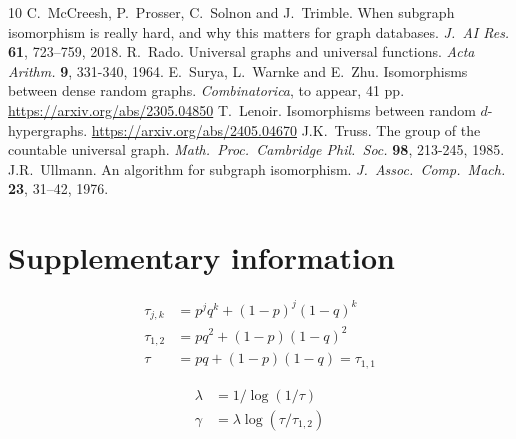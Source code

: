 \documentclass[reqno]{amsart}
\theoremstyle{theorem}
\theoremstyle{definition}
\theoremstyle{remark}
\newcommand{\1}{{\text{\Large $\mathfrak 1$}}}	%
\numberwithin{equation}{section}
\begin{document}
\begin{thebibliography}{10}
C.\ McCreesh, P.\ Prosser, C.\ Solnon and J.\ Trimble.
When subgraph isomorphism is really hard, and why this
matters for graph databases.
{\em J.\ AI Res.} {\bf 61}, 723--759, 2018.
R.\ Rado.
Universal graphs and universal functions.
{\em Acta Arithm.} {\bf 9}, 331-340, 1964.
E.\ Surya, L.\ Warnke and E.\ Zhu.
Isomorphisms between dense random graphs.
{\em Combinatorica}, to appear, 41 pp.
\href{https://arxiv.org/abs/2305.04850}{https://arxiv.org/abs/2305.04850}
T.\ Lenoir.
Isomorphisms between random $d$-hypergraphs.
\href{https://arxiv.org/abs/2405.04670}{https://arxiv.org/abs/2405.04670}
J.K.\ Truss. 
The group of the countable universal graph.
{\em Math.\ Proc.\ Cambridge Phil.\ Soc.} 
{\bf 98},
213-245, 
1985.
J.R.\ Ullmann. 
An algorithm for subgraph isomorphism.
{\em J.\ Assoc.\ Comp.\ Mach.} {\bf 23}, 31--42, 1976.
\end{thebibliography}


\appendix
\section{\bfseries Supplementary information}
\label{suppinfo}

\begin{align*}
\tau_{j,k} &= p^jq^k + (1-p)^j (1-q)^k
\\
\tau_{1,2} &= pq^2 + (1-p) (1-q)^2
\\
\tau &= pq+ (1-p)(1-q) = \tau_{1,1} 
\end{align*}

\begin{align*}
\lambda &= 1/\log(1/\tau)
\\
\gamma &= \lambda \log (\tau/\tau_{1,2})
\end{align*}
\end{document}
